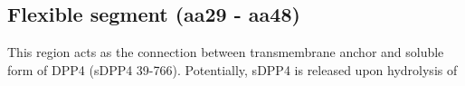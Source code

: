 \subsection{Flexible segment (aa29 - aa48)}

This region acts as the connection between transmembrane anchor and soluble form of DPP4 (sDPP4 39-766). Potentially, sDPP4 is released upon hydrolysis of 
